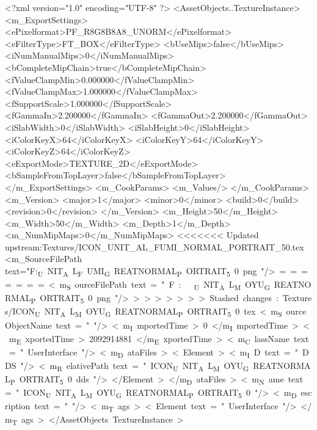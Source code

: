 <?xml version="1.0" encoding="UTF-8" ?>
<AssetObjects..TextureInstance>
	<m_ExportSettings>
		<ePixelformat>PF_R8G8B8A8_UNORM</ePixelformat>
		<eFilterType>FT_BOX</eFilterType>
		<bUseMips>false</bUseMips>
		<iNumManualMips>0</iNumManualMips>
		<bCompleteMipChain>true</bCompleteMipChain>
		<fValueClampMin>0.000000</fValueClampMin>
		<fValueClampMax>1.000000</fValueClampMax>
		<fSupportScale>1.000000</fSupportScale>
		<fGammaIn>2.200000</fGammaIn>
		<fGammaOut>2.200000</fGammaOut>
		<iSlabWidth>0</iSlabWidth>
		<iSlabHeight>0</iSlabHeight>
		<iColorKeyX>64</iColorKeyX>
		<iColorKeyY>64</iColorKeyY>
		<iColorKeyZ>64</iColorKeyZ>
		<eExportMode>TEXTURE_2D</eExportMode>
		<bSampleFromTopLayer>false</bSampleFromTopLayer>
	</m_ExportSettings>
	<m_CookParams>
		<m_Values/>
	</m_CookParams>
	<m_Version>
		<major>1</major>
		<minor>0</minor>
		<build>0</build>
		<revision>0</revision>
	</m_Version>
	<m_Height>50</m_Height>
	<m_Width>50</m_Width>
	<m_Depth>1</m_Depth>
	<m_NumMipMaps>0</m_NumMipMaps>
<<<<<<< Updated upstream:Textures/ICON_UNIT_AL_FUMI_NORMAL_PORTRAIT_50.tex
	<m_SourceFilePath text="F:\DT\lilyimages\unit\ICON_UNIT_AL_FUMI_GREATNORMAL_PORTRAIT_50.png"/>
=======
	<m_SourceFilePath text="F:\DT\lilyimages\unit\ICON_UNIT_AL_MOYU_GREATNORMAL_PORTRAIT_50.png"/>
>>>>>>> Stashed changes:Textures/ICON_UNIT_AL_MOYU_GREATNORMAL_PORTRAIT_50.tex
	<m_SourceObjectName text=""/>
	<m_ImportedTime>0</m_ImportedTime>
	<m_ExportedTime>2092914881</m_ExportedTime>
	<m_ClassName text="UserInterface"/>
	<m_DataFiles>
		<Element>
			<m_ID text="DDS"/>
			<m_RelativePath text="ICON_UNIT_AL_MOYU_GREATNORMAL_PORTRAIT_50.dds"/>
		</Element>
	</m_DataFiles>
	<m_Name text="ICON_UNIT_AL_MOYU_GREATNORMAL_PORTRAIT_50"/>
	<m_Description text=""/>
	<m_Tags>
		<Element text="UserInterface"/>
	</m_Tags>
</AssetObjects..TextureInstance>

